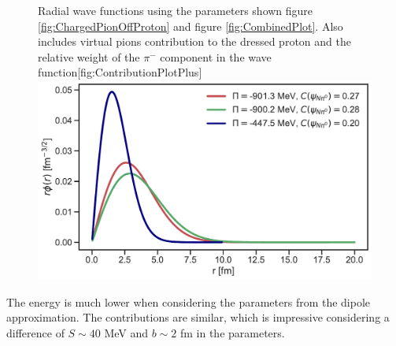 \begin{figure}[H]
	\begin{sidecaption}{Radial wave functions using the parameters shown figure \ref{fig:ChargedPionOffProton} and figure \ref{fig:CombinedPlot}. Also includes virtual pions contribution to the dressed proton and the relative weight of the $\pi^-$ component in the wave function}[fig:ContributionPlotPlus]
		\includegraphics[width=\linewidth]{Figures/ContributionPlotPiPlus.pdf}
	\end{sidecaption}
\end{figure}
The energy is much lower when considering the parameters from the dipole approximation. The contributions are similar, which is impressive considering a difference of $S \sim  40$ MeV and $b\sim2$ fm in the parameters. 
